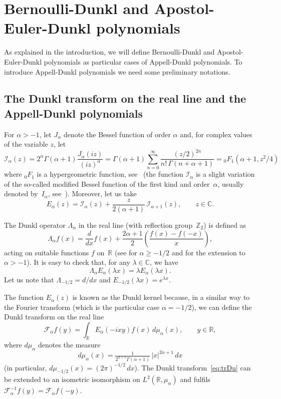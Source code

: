 \documentclass[10pt,a4paper]{article}
\theoremstyle{plain}
\theoremstyle{definition}
\numberwithin{equation}{section} %
\newcommand{\Ea}{E_{\alpha}}
\newcommand{\La}{\Lambda_{\alpha}}
\newcommand{\Fa}{\mathcal{F}_{\alpha}} %
\newcommand{\mua}{\mu_{\alpha}}
\newcommand{\I}{\mathcal{I}}
\newcommand{\RR}{\mathbb{R}}
\newcommand{\ZZ}{\mathbb{Z}}
\newcommand{\CC}{\mathbb{C}}
\begin{document}
\section{Bernoulli-Dunkl and Apostol-Euler-Dunkl polynomials}
\label{sec:B-D}

As explained in the introduction, we will define Bernoulli-Dunkl and Apostol-Euler-Dunkl polynomials as particular cases of Appell-Dunkl polynomials.
To introduce Appell-Dunkl polynomials we need some preliminary notations.

\subsection{The Dunkl transform on the real line and the Appell-Dunkl polynomials}

For $\alpha > -1$, let $J_\alpha$ denote the Bessel function of order $\alpha$ and,
for complex values of the variable $z$, let
\[
  \I_\alpha(z)
  = 2^\alpha \Gamma(\alpha+1) \frac{J_\alpha(iz)}{(iz)^\alpha}
  = \Gamma(\alpha+1) \sum_{n=0}^\infty \frac{(z/2)^{2n}}{n!\,\Gamma(n+\alpha+1)}
  = {}_0F_1(\alpha+1,z^2/4)
\]
where ${}_0F_1$ is a hypergeometric function, see~\cite[Chapter~IV]{EMOT}
(the function $\I_\alpha$ is a slight variation of the so-called modified Bessel function of the first kind and order~$\alpha$, usually denoted by~$I_\alpha$, see~\cite{Wat, Le, OlMa-NIST}).
Moreover, let us take
\[
  \Ea(z) = \I_\alpha(z) + \frac{z}{2(\alpha+1)}\,
  \I_{\alpha+1}(z),
  \qquad z \in \CC.
\]

The Dunkl operator $\La$ in the real line (with reflection group~$\ZZ_2$) is defined as
\begin{equation}
\label{eq:Duop}
  \La f(x) = \frac{d}{dx}f(x) + \frac{2\alpha+1}{2}
  \left(\frac{f(x)-f(-x)}{x}\right),
\end{equation}
acting on suitable functions $f$ on~$\RR$ (see \cite{Du} for $\alpha\ge-1/2$ and \cite{Ros} for the extension to $\alpha>-1$).
It is easy to check that, for any $\lambda \in \CC$, we have
\[
  \La \Ea(\lambda x) = \lambda \Ea(\lambda x).
\]
Let us note that $\Lambda_{-1/2} = d/dx$ and $E_{-1/2}(\lambda x) = e^{\lambda x}$.

The function $\Ea(z)$ is known as the Dunkl kernel because, in a similar way to the Fourier transform (which is the particular case $\alpha = -1/2$), we can define the Dunkl transform on the real line
\begin{equation}
\label{eq:trDu}
  \Fa f(y)
  = \int_{\RR} \Ea(-ixy)f(x)\,d\mua(x),
  \qquad y \in \RR,
\end{equation}
where $d\mua$ denotes the measure
\[
  d\mua(x) = \tfrac{1}{2^{\alpha+1}\Gamma(\alpha+1)}\, |x|^{2\alpha+1}\,dx
\]
(in particular, $d\mu_{-1/2}(x) = (2\pi)^{-1/2}\,dx$).
The Dunkl transform~\eqref{eq:trDu} can be extended to an isometric isomorphism on $L^2(\RR,\mua)$ and fulfils $\Fa^{-1}f(y) = \Fa f(-y)$.
\end{document}
